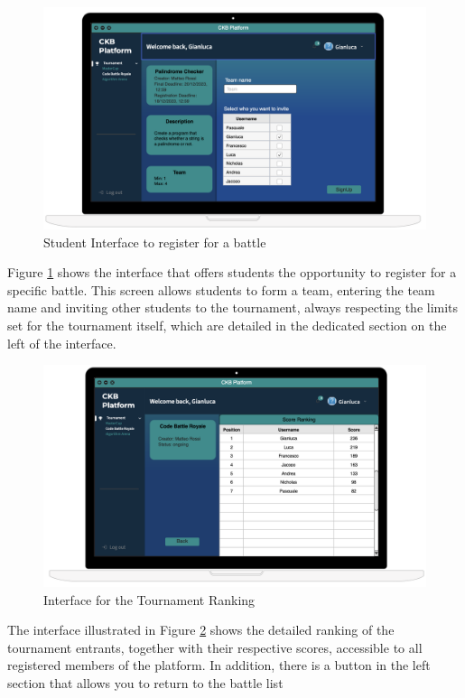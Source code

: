 \begin{figure}[h]
    \centering
    \includegraphics[scale=0.35]{images/Mockup/SignUpBattleMockup.png} 
    \caption{Student Interface to register for a battle}
    \label{fig_SignUpBattleMockup}
\end{figure}

Figure \ref{fig_SignUpBattleMockup} shows the interface that offers students the opportunity to register for a specific battle.  This screen allows students to form a team, entering the team name and inviting other students to the tournament, always respecting the limits set for the tournament itself, which are detailed in the dedicated section on the left of the interface.

\clearpage
\begin{figure}[h]
    \centering
    \includegraphics[scale=0.35]{images/Mockup/TournamentRankingMockup.png} 
    \caption{Interface for the Tournament Ranking}
    \label{fig_TournamentRankingMockup}
\end{figure}

The interface illustrated in Figure \ref{fig_TournamentRankingMockup} shows the detailed ranking of the tournament entrants, together with their respective scores, accessible to all registered members of the platform.
In addition, there is a button in the left section that allows you to return to the battle list





